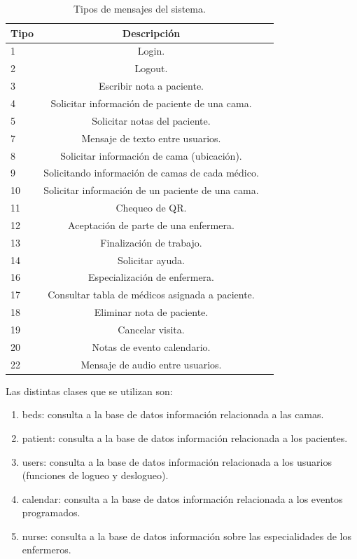 \begin{table}[h]
	\centering
	\caption[Tipos de mensajes MQTT]{Tipos de mensajes del sistema.}
	\begin{tabular}{l c c}    
		\toprule
		\textbf{Tipo}     & \textbf{Descripción} \\
		\midrule
		1 & Login.    \\		
		2 & Logout.\\
		3 & Escribir nota a paciente.\\
		4 & Solicitar información de paciente de una cama.\\
		5 & Solicitar notas del paciente. \\
		7 & Mensaje de texto entre usuarios.\\
		8 & Solicitar información de cama (ubicación).\\
		9 & Solicitando información de camas de cada médico.\\
		10 & Solicitar información de un paciente de una cama.\\
		11 & Chequeo de QR.\\
		12 & Aceptación de parte de una enfermera.\\
		13 & Finalización de trabajo.\\
		14 & Solicitar ayuda.\\
		16 & Especialización de enfermera.\\
		17 & Consultar tabla de médicos asignada a paciente.\\
		18 & Eliminar nota de paciente.\\
		19 & Cancelar visita.\\
		20 & Notas de evento calendario.\\
		22 & Mensaje de audio entre usuarios.\\
		\bottomrule
		\hline
	\end{tabular}
	\label{tab:Tipos de Mensajes MQTT}
\end{table}

Las distintas clases que se utilizan son: 
\begin{enumerate}
\item beds: consulta a la base de datos información relacionada a las camas.
\item patient: consulta a la base de datos información relacionada a los pacientes. 
\item users: consulta a la base de datos información relacionada a los usuarios (funciones de logueo y deslogueo).
\item calendar: consulta a la base de datos información relacionada a los eventos programados.
\item nurse: consulta a la base de datos información sobre las especialidades de los enfermeros.
\end{enumerate}

